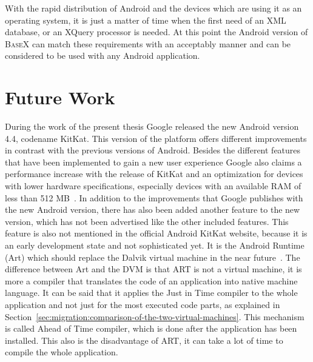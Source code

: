



With the rapid distribution of Android and the devices which are using it as an operating system, it is just a matter of time when the first need of an XML database, or an XQuery processor is needed.
At this point the Android version of \textsc{BaseX} can match these requirements with an acceptably manner and can be considered to be used with any Android application.




\section{Future Work}
\label{sec:summery:future-work}
During the work of the present thesis Google released the new Android version 4.4, codename KitKat.
This version of the platform offers different improvements in contrast with the previous versions of Android.
Besides the different features that have been implemented to gain a new user experience Google also claims a performance increase with the release of KitKat and an optimization for devices with lower hardware specifications, especially devices with an available RAM of less than 512 MB~\cite{google-kitkat}.
In addition to the improvements that Google publishes with the new Android version, there has also been added another feature to the new version, which has not been advertised like the other included features.
This feature is also not mentioned in the official Android KitKat website, because it is an early development state and not sophisticated yet.
It is the Android Runtime (Art) which should replace the Dalvik virtual machine in the near future~\cite{android-art}.
The difference between Art and the DVM is that ART is not a virtual machine, it is more a compiler that translates the code of an application into native machine language.
It can be said that it applies the Just in Time compiler to the whole application and not just for the most executed code parts, as explained in Section~\ref{sec:migration:comparison-of-the-two-virtual-machines}.
This mechanism is called Ahead of Time compiler, which is done after the application has been installed.
This also is the disadvantage of ART, it can take a lot of time to compile the whole application.
